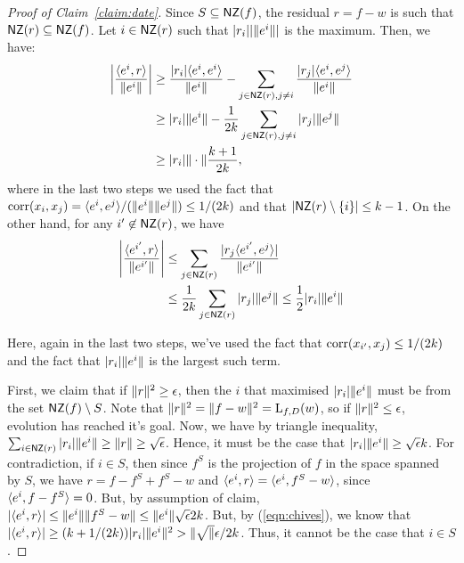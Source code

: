 \begin{proof}[Proof of Claim~\ref{claim:date}] Since $S \subseteq \mathsf{NZ}(f)$, the
residual $r = f - w$ is such that $\mathsf{NZ}(r) \subseteq \mathsf{NZ}(f)$. Let $i \in \mathsf{NZ}(r)$
such that $|r_i||\Vert e^i \Vert|$ is the maximum. Then, we have:
\begin{align}
\left|\frac{\langle e^i, r \rangle}{\Vert e^i \Vert} \right| &\geq
\frac{|r_i|\langle e^i, e^i \rangle}{\Vert e^i \Vert} - \sum_{j \in \mathsf{NZ}(r), j \neq i}
\frac{|r_j|\langle e^i, e^j \rangle}{\Vert e^i \Vert} \nonumber  \\
&\geq |r_i|\Vert e^i \Vert - \frac{1}{2k} \sum_{j \in \mathsf{NZ}(r), j \neq i}
|r_j| \Vert e^j \Vert \label{eqn:chives} \\
&\geq |r_i| \Vert \cdot \Vert \frac{k+1}{2k}, \nonumber
\end{align}
where in the last two steps we used the fact that $\mathrm{corr}(x_i, x_j) =
\langle e^i, e^j \rangle/(\Vert e^i \Vert \Vert e^j \Vert) \leq 1/(2k)$ and that $|\mathsf{NZ}(r)
\setminus \{ i \}| \leq k-1$. On the other hand, for any $i^\prime \not\in
\mathsf{NZ}(r)$, we have
\begin{align}
\left| \frac{\langle e^{i^\prime}, r \rangle}{\Vert e^{i^\prime} \Vert} \right| &\leq
\sum_{j \in \mathsf{NZ}(r)} \frac{|r_j\langle e^{i^\prime}, e^j \rangle|}{\Vert e^{i^\prime} \Vert}
\nonumber \\
&\leq \frac{1}{2k} \sum_{j \in \mathsf{NZ}(r)} |r_j| \Vert e^j \Vert \leq \frac{1}{2}
|r_i| \Vert e^i \Vert \label{eqn:dill}
\end{align}

Here, again in the last two steps, we've used the fact that $\mathrm{corr}(x_{i^\prime},
x_j) \leq 1/(2k)$ and the fact that $|r_i| \Vert e^i \Vert$ is the largest such
term. 

First, we claim that if $\Vert r \Vert^2 \geq \epsilon$, then the $i$ that
maximised $|r_i| \Vert e^i \Vert$ must be from the set $\mathsf{NZ}(f) \setminus S$. Note
that $\Vert r \Vert^2 = \Vert f - w \Vert^2 = \mathrm{L}_{f, D}(w)$, so if
$\Vert r \Vert^2 \leq \epsilon$, evolution has reached it's goal. Now, we have by
triangle inequality, $\sum_{i \in \mathsf{NZ}(r)} |r_i| \Vert e^i \Vert \geq \Vert r \Vert
\geq \sqrt{\epsilon}$. Hence, it must be the case that $|r_i| \Vert e^i \Vert
\geq \sqrt{\epsilon}{k}$. For contradiction, if $i \in S$, then since $f^S$ is
the projection of $f$ in the space spanned by $S$, we have $r = f - f^S + f^S -
w$ and $\langle e^i, r \rangle = \langle e^i, f^S - w \rangle$, since $\langle e^i, f - f^S \rangle = 0$. But, by
assumption of claim, $|\langle e^i, r \rangle|\leq \Vert e^i \Vert \Vert f^S - w \Vert \leq
\Vert e^i \Vert \sqrt{\epsilon}{2k}$. But, by (\ref{eqn:chives}), we know that
$|\langle e^i, r \rangle| \geq (k+1/(2k)) |r_i| \Vert e^i \Vert^2 > \Vert \sqrt \Vert{\epsilon}/2k$. Thus, it cannot be the case that $i \in S$. 


\end{proof}
